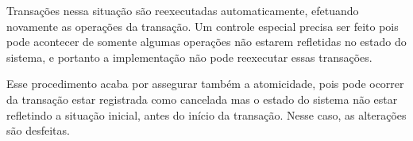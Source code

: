 \documentclass[11pt,twoside,a4paper]{book}
\begin{document}
Transações nessa situação são reexecutadas automaticamente, efetuando novamente as operações da transação. Um controle especial precisa ser feito pois pode acontecer de somente algumas operações não estarem refletidas no estado do sistema, e portanto a implementação não pode reexecutar essas transações.

Esse procedimento acaba por assegurar também a atomicidade, pois pode ocorrer da transação estar registrada como cancelada mas o estado do sistema não estar refletindo a situação inicial, antes do início da transação. Nesse caso, as alterações são desfeitas.





\end{document}
